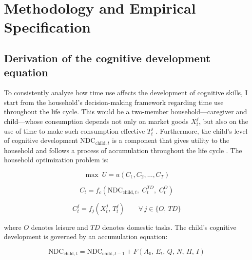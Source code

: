 \documentclass[12pt]{article}
\newcommand{\NDC}{\mathrm{NDC}}
\newcommand{\child}{\text{child}}
\begin{document}
\section{Methodology and Empirical Specification}
\label{sec:methodology}

\subsection{Derivation of the cognitive development equation}
\label{subsec:derivation}

To consistently analyze how time use affects the development of cognitive
skills, I start from the household's decision-making framework regarding time
use throughout the life cycle. This would be a two-member household—caregiver
and child—whose consumption depends not only on market goods $X_{t}^{j}$, but
also on the use of time to make such consumption effective
$T_{t}^{j}$ \citep{becker1993}. Furthermore, the child's level of cognitive
development $\NDC_{\child,t}$ is a component that gives utility to the
household and follows a process of accumulation throughout the life cycle
\citep{benporath1967}. The household optimization problem is:

\begin{equation}
  \max \; U = u(C_1, C_2, \ldots, C_T)
  \label{eq:utility}
\end{equation}

\begin{equation}
  C_t = f_c\!\left(\NDC_{\child,t},\; C_t^{TD},\; C_t^{O}\right)
  \label{eq:consumption}
\end{equation}

\begin{equation}
  C_t^{j} = f_j\!\left(X_t^{j},\, T_t^{j}\right)
  \qquad \forall\, j \in \{O,\, TD\}
  \label{eq:subconsumption}
\end{equation}

where $O$ denotes leisure and $TD$ denotes domestic tasks. The child's
cognitive development is governed by an accumulation equation:

\begin{equation}
  \NDC_{\child,t} = \NDC_{\child,t-1} + F(A_0,\, E_t,\, Q,\, N,\, H,\, I)
  \label{eq:ndc}
\end{equation}
\end{document}
